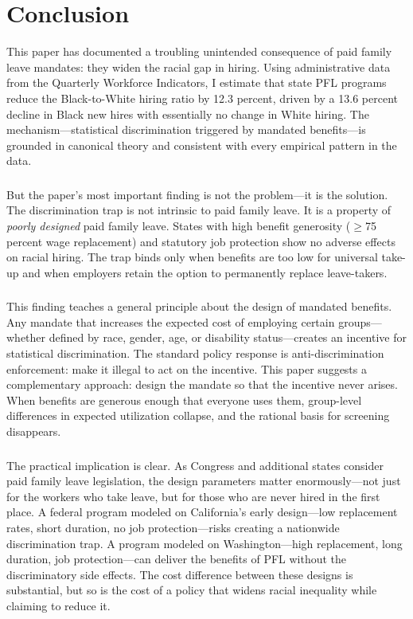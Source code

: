 \documentclass[12pt]{article}
\begin{document}
\section{Conclusion}

This paper has documented a troubling unintended consequence of paid family leave mandates: they widen the racial gap in hiring. Using administrative data from the Quarterly Workforce Indicators, I estimate that state PFL programs reduce the Black-to-White hiring ratio by 12.3 percent, driven by a 13.6 percent decline in Black new hires with essentially no change in White hiring. The mechanism---statistical discrimination triggered by mandated benefits---is grounded in canonical theory and consistent with every empirical pattern in the data.

\subsubsection*{}
But the paper's most important finding is not the problem---it is the solution. The discrimination trap is not intrinsic to paid family leave. It is a property of \textit{poorly designed} paid family leave. States with high benefit generosity ($\geq$75 percent wage replacement) and statutory job protection show no adverse effects on racial hiring. The trap binds only when benefits are too low for universal take-up and when employers retain the option to permanently replace leave-takers.

\subsubsection*{}
This finding teaches a general principle about the design of mandated benefits. Any mandate that increases the expected cost of employing certain groups---whether defined by race, gender, age, or disability status---creates an incentive for statistical discrimination. The standard policy response is anti-discrimination enforcement: make it illegal to act on the incentive. This paper suggests a complementary approach: design the mandate so that the incentive never arises. When benefits are generous enough that everyone uses them, group-level differences in expected utilization collapse, and the rational basis for screening disappears.

\subsubsection*{}
The practical implication is clear. As Congress and additional states consider paid family leave legislation, the design parameters matter enormously---not just for the workers who take leave, but for those who are never hired in the first place. A federal program modeled on California's early design---low replacement rates, short duration, no job protection---risks creating a nationwide discrimination trap. A program modeled on Washington---high replacement, long duration, job protection---can deliver the benefits of PFL without the discriminatory side effects. The cost difference between these designs is substantial, but so is the cost of a policy that widens racial inequality while claiming to reduce it.
\end{document}
